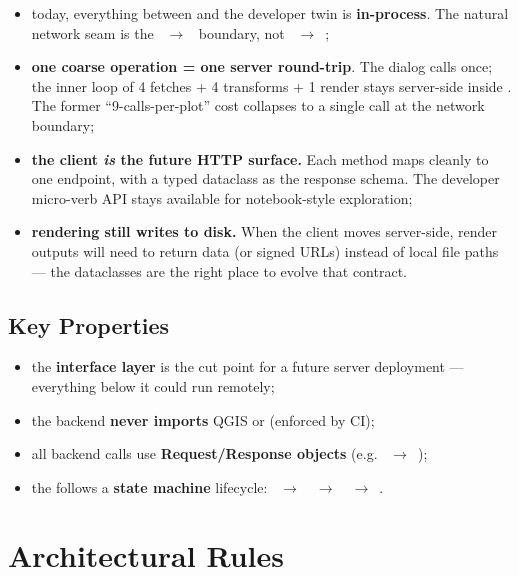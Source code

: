 \begin{itemize}
    \item today, everything between  and the developer twin is \textbf{in-process}. The natural network seam is the ~$\rightarrow$~ boundary, not ~$\rightarrow$~;
    \item \textbf{one coarse operation = one server round-trip}. The dialog calls  once; the inner loop of 4 fetches + 4 transforms + 1 render stays server-side inside . The former ``9-calls-per-plot'' cost collapses to a single call at the network boundary;
    \item \textbf{the client \emph{is} the future HTTP surface.} Each  method maps cleanly to one endpoint, with a typed  dataclass as the response schema. The developer micro-verb API stays available for notebook-style exploration;
    \item \textbf{rendering still writes to disk.} When the client moves server-side, render outputs will need to return data (or signed URLs) instead of local file paths --- the  dataclasses are the right place to evolve that contract.
\end{itemize}

\subsection{Key Properties}
\label{sec-key-properties}

\begin{itemize}
    \item the \textbf{interface layer} is the cut point for a future server deployment --- everything below it could run remotely;
    \item the backend \textbf{never imports} QGIS or  (enforced by CI);
    \item all backend calls use \textbf{Request/Response objects} (e.g. ~$\rightarrow$~);
    \item the  follows a \textbf{state machine} lifecycle: ~$\rightarrow$~~$\rightarrow$~~$\rightarrow$~.
\end{itemize}

\section{Architectural Rules}
\label{sec-dev-rules}

